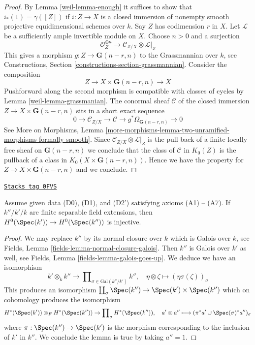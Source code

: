 \begin{proof}

By Lemma \ref{weil-lemma-enough} it suffices to show that $i_*(1) = \gamma([Z])$
if $i : Z \to X$ is a closed immersion of nonempty
smooth projective equidimensional
schemes over $k$. Say $Z$ has codimension $r$ in $X$.
Let $\mathcal{L}$ be a sufficiently ample invertible module on $X$.
Choose $n > 0$ and a surjection
$$
\mathcal{O}_Z^{\oplus n} \to \mathcal{C}_{Z/X} \otimes \mathcal{L}|_Z
$$
This gives a morphism $g : Z \to \mathbf{G}(n - r, n)$
to the Grassmannian over $k$, see
Constructions, Section \ref{constructions-section-grassmannian}.
Consider the composition
$$
Z \to X \times \mathbf{G}(n - r, n) \to X
$$
Pushforward along the second morphism is compatible with classes
of cycles by Lemma \ref{weil-lemma-grassmanian}. The conormal sheaf $\mathcal{C}$
of the closed immersion $Z \to X \times \mathbf{G}(n - r, n)$ sits in
a short exact sequence
$$
0 \to \mathcal{C}_{Z/X} \to \mathcal{C} \to
g^*\Omega_{\mathbf{G}(n - r, n)} \to 0
$$
See More on Morphisms, Lemma
\ref{more-morphisms-lemma-two-unramified-morphisms-formally-smooth}.
Since $\mathcal{C}_{Z/X} \otimes \mathcal{L}|_Z$ is the pull
back of a finite locally free sheaf on $\mathbf{G}(n - r, n)$
we conclude that the class of $\mathcal{C}$ in $K_0(Z)$
is the pullback of a class in $K_0(X \times \mathbf{G}(n - r, n))$.
Hence we have the property for $Z \to X \times \mathbf{G}(n - r, n)$
and we conclude.
\end{proof}

\begin{lemma}[Injective H0]
\label{weil-lemma-injective-H0}
\href{https://stacks.math.columbia.edu/tag/0FVS}{\texttt{Stacks tag 0FVS}}

Assume given data (D0), (D1), and (D2') satisfying axioms (A1) -- (A7).
If $k''/k'/k$ are finite separable field extensions, then
$H^0(\Spec(k')) \to H^0(\Spec(k''))$ is injective.
\end{lemma}

\begin{proof}
We may replace $k''$ by its normal closure over $k$
which is Galois over $k$, see
Fields, Lemma \ref{fields-lemma-normal-closure-galois}.
Then $k''$ is Galois over $k'$ as well, see
Fields, Lemma \ref{fields-lemma-galois-goes-up}.
We deduce we have an isomorphism
$$
k' \otimes_k k'' \longrightarrow
\prod\nolimits_{\sigma \in \text{Gal}(k''/k')} k'',\quad
\eta \otimes \zeta \longmapsto (\eta \sigma(\zeta))_\sigma
$$
This produces an isomorphism
$\coprod_\sigma \Spec(k'') \to \Spec(k') \times \Spec(k'')$
which on cohomology produces the isomorphism
$$
H^*(\Spec(k')) \otimes_F H^*(\Spec(k''))
\to
\prod\nolimits_\sigma H^*(\Spec(k'')),\quad
a' \otimes a'' \longmapsto (\pi^*a' \cup \Spec(\sigma)^*a'')_\sigma
$$
where $\pi : \Spec(k'') \to \Spec(k')$ is the morphism
corresponding to the inclusion of $k'$ in $k''$.
We conclude the lemma is true by taking $a'' = 1$.
\end{proof}

